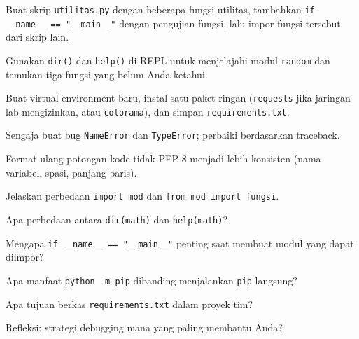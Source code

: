 \documentclass[../main.tex]{subfiles}
\begin{document}
\begin{aktivitas}
  \item Buat skrip \texttt{utilitas.py} dengan beberapa fungsi utilitas, tambahkan \texttt{if \_\_name\_\_ == "\_\_main\_\_"} dengan pengujian fungsi, lalu impor fungsi tersebut dari skrip lain.
  \item Gunakan \texttt{dir()} dan \texttt{help()} di REPL untuk menjelajahi modul \texttt{random} dan temukan tiga fungsi yang belum Anda ketahui.
  \item Buat virtual environment baru, instal satu paket ringan (\texttt{requests} jika jaringan lab mengizinkan, atau \texttt{colorama}), dan simpan \texttt{requirements.txt}.
  \item Sengaja buat bug \texttt{NameError} dan \texttt{TypeError}; perbaiki berdasarkan traceback.
  \item Format ulang potongan kode tidak PEP 8 menjadi lebih konsisten (nama variabel, spasi, panjang baris).
\end{aktivitas}

\begin{latihan}
  \item Jelaskan perbedaan \texttt{import mod} dan \texttt{from mod import fungsi}.
  \item Apa perbedaan antara \texttt{dir(math)} dan \texttt{help(math)}?
  \item Mengapa \texttt{if \_\_name\_\_ == "\_\_main\_\_"} penting saat membuat modul yang dapat diimpor?
  \item Apa manfaat \texttt{python -m pip} dibanding menjalankan \texttt{pip} langsung?
  \item Apa tujuan berkas \texttt{requirements.txt} dalam proyek tim?
  \item Refleksi: strategi debugging mana yang paling membantu Anda?
\end{latihan}
\end{document}
